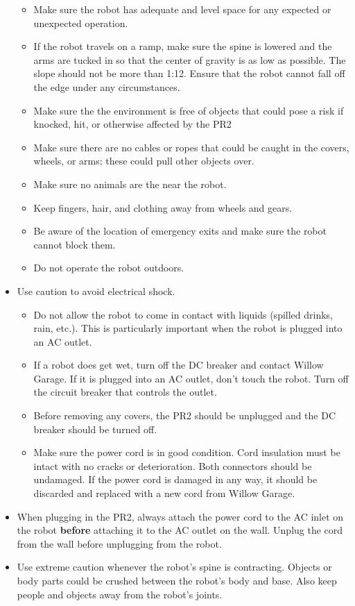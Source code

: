 \begin{itemize}
\begin{itemize}
\item Make sure the robot has adequate and level space for any expected or unexpected operation.
\item If the robot travels on a ramp, make sure the spine is lowered and the arms are tucked in so that the center of gravity is as low as possible. The slope should not be more than 1:12. Ensure that the robot cannot fall off the edge under any circumstances.
\item Make sure the the environment is free of objects that could pose a risk if knocked, hit, or otherwise affected by the PR2
\item Make sure there are no cables or ropes that could be caught in the covers, wheels, or arms; these could pull other objects over.
\item Make sure no animals are the near the robot.
\item Keep fingers, hair, and clothing away from wheels and gears.
\item Be aware of the location of emergency exits and make sure the robot cannot block them.
\item Do not operate the robot outdoors.
\end{itemize}
\item Use caution to avoid electrical shock.
\begin{itemize}
\item Do not allow the robot to come in contact with liquids (spilled drinks, rain, etc.). This is particularly important when the robot is plugged into an AC outlet.
\item If a robot does get wet, turn off the DC breaker and contact Willow Garage. If it is plugged into an AC outlet, don't touch the robot. Turn off the circuit breaker that controls the outlet.
\item Before removing any covers, the PR2 should be unplugged and the DC breaker should be turned off.
\item Make sure the power cord is in good condition. Cord insulation must be intact with no cracks or deterioration. Both connectors should be undamaged. If the power cord is damaged in any way, it should be discarded and replaced with a new cord from Willow Garage.
\end{itemize}
\item When plugging in the PR2, always attach the power cord to the AC inlet on the robot {\bf before} attaching it to the AC outlet on the wall. Unplug the cord from the wall before unplugging from the robot.
\item Use extreme caution whenever the robot's spine is contracting. Objects or body parts could be crushed between the robot's body and base. Also keep people and objects away from the robot's joints.

\end{itemize}
